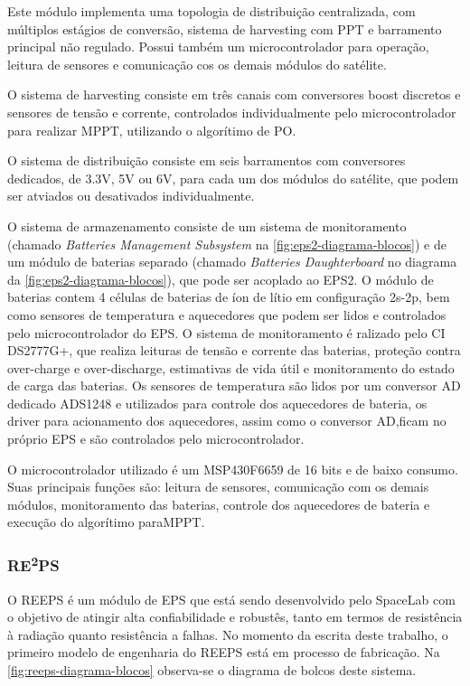 Este módulo implementa uma topologia de distribuição centralizada, com múltiplos estágios de conversão, sistema de harvesting com \gls{PPT} e barramento principal não regulado.
Possui também um microcontrolador para operação, leitura de sensores e comunicação cos os demais módulos do satélite.

O sistema de harvesting consiste em três canais com conversores boost discretos e sensores de tensão e corrente, controlados individualmente pelo microcontrolador para realizar \gls{MPPT}, utilizando o algorítimo de \gls{PO}.

O sistema de distribuição consiste em seis barramentos com conversores dedicados, de 3.3V, 5V ou 6V, para cada um dos módulos do satélite, que podem ser atviados ou desativados individualmente.

O sistema de armazenamento consiste de um sistema de monitoramento (chamado \textit{Batteries Management Subsystem} na \autoref{fig:eps2-diagrama-blocos}) e de um módulo de baterias separado (chamado \textit{Batteries Daughterboard} no diagrama da \autoref{fig:eps2-diagrama-blocos}), que pode ser acoplado ao \gls{EPS2}.
O módulo de baterias contem 4 células de baterias de íon de lítio em configuração 2s-2p, bem como sensores de temperatura e aquecedores que podem ser lidos e controlados pelo microcontrolador do \gls{EPS}.
O sistema de monitoramento é ralizado pelo CI DS2777G+, que realiza leituras de tensão e corrente das baterias, proteção contra over-charge e over-discharge, estimativas de vida útil e monitoramento do estado de carga das baterias.
Os sensores de temperatura são lidos por um conversor AD dedicado ADS1248 e utilizados para controle dos aquecedores de bateria, os driver para acionamento dos aquecedores, assim como o conversor AD,ficam no próprio \gls{EPS} e são controlados pelo microcontrolador.

O microcontrolador utilizado é um MSP430F6659 de 16 bits e de baixo consumo.
Suas principais funções são: leitura de sensores, comunicação com os demais módulos, monitoramento das baterias, controle dos aquecedores de bateria e execução do algorítimo para\gls{MPPT}.


\subsubsection{\texorpdfstring{RE\textsuperscript{2}PS}{REEPS}}


O \gls{REEPS} é um módulo de \gls{EPS} que está sendo desenvolvido pelo SpaceLab com o objetivo de atingir alta confiabilidade e robustês, tanto em termos de resistência à radiação quanto resistência a falhas.
No momento da escrita deste trabalho, o primeiro modelo de engenharia do \gls{REEPS} está em processo de fabricação.
Na \autoref{fig:reeps-diagrama-blocos} observa-se o diagrama de bolcos deste sistema.

